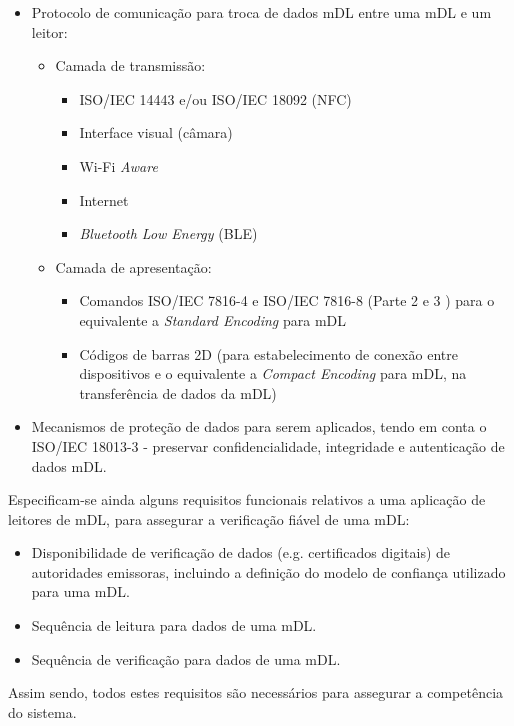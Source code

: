 \begin{itemize}
	\item Protocolo de comunicação para troca de dados mDL entre uma mDL e um leitor:
	\begin{itemize}
		\item Camada de transmissão:
		\begin{itemize}
			\item ISO/IEC 14443 e/ou ISO/IEC 18092 (NFC)
			\item Interface visual (câmara)
			\item Wi-Fi \textit{Aware}
			\item Internet
			\item \textit{Bluetooth Low Energy} (BLE)
		\end{itemize}
		\item Camada de apresentação:
		\begin{itemize}
			\item Comandos ISO/IEC 7816-4 e ISO/IEC 7816-8 (Parte 2 e 3 ) para o equivalente a \textit{Standard Encoding} para mDL
			\item Códigos de barras 2D (para estabelecimento de conexão entre dispositivos e o equivalente a \textit{Compact Encoding} para mDL, na transferência de dados da mDL)
		\end{itemize}
	\end{itemize}

	\item Mecanismos de proteção de dados para serem aplicados, tendo em conta o ISO/IEC 18013-3 - preservar confidencialidade, integridade e autenticação de dados mDL.
\end{itemize}

Especificam-se ainda alguns requisitos funcionais relativos a uma aplicação de leitores de mDL, para assegurar a verificação fiável de uma mDL:

\begin{itemize}
	\item Disponibilidade de verificação de dados (e.g. certificados digitais) de autoridades emissoras, incluindo a definição do modelo de confiança utilizado para uma mDL.
	\item Sequência de leitura para dados de uma mDL.
	\item Sequência de verificação para dados de uma mDL.
\end{itemize}

Assim sendo, todos estes requisitos são necessários para assegurar a competência do sistema.
